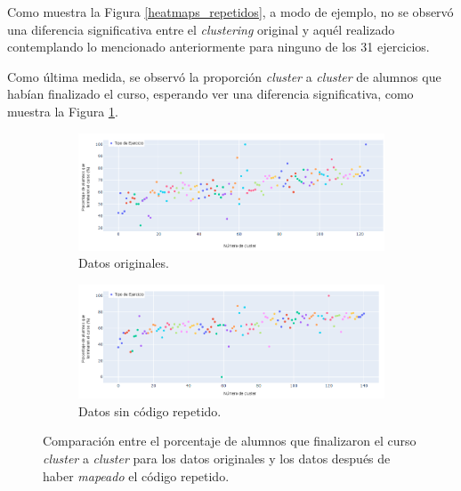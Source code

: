 \documentclass[11pt,a4paper,twoside,openany]{tesis}
\begin{document}
Como muestra la Figura \ref{heatmaps_repetidos}, a modo de ejemplo, no se observó una diferencia significativa entre el \emph{clustering} original y aquél realizado contemplando lo mencionado anteriormente para ninguno de los 31 ejercicios.

Como última medida, se observó la proporción \emph{cluster} a \emph{cluster} de alumnos que habían finalizado el curso, esperando ver una diferencia significativa, como muestra la Figura \ref{porcentajes}.

\begin{figure}[H]
    \centering
    \begin{subfigure}{0.45\textwidth}
        \includegraphics[width=\linewidth]{imagenes/porcentaje - original.png}
        \caption{Datos originales.}
    \end{subfigure}
    \hfill
    \begin{subfigure}{0.45\textwidth}
        \includegraphics[width=\linewidth]{imagenes/porcentaje - unniques.png}
        \caption{Datos sin código repetido.}
    \end{subfigure}
    \caption{Comparación entre el porcentaje de alumnos que finalizaron el curso \emph{cluster} a \emph{cluster} para los datos originales y los datos después de haber \emph{mapeado} el código repetido.}
    \label{porcentajes}
\end{figure}
\end{document}
